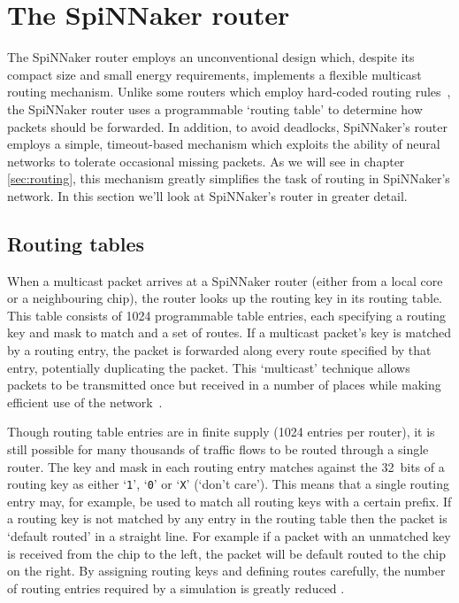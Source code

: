	\section{The SpiNNaker router}
		
		The SpiNNaker router employs an unconventional design which, despite its
		compact size and small energy requirements, implements a flexible multicast
		routing mechanism. Unlike some routers which employ hard-coded routing
		rules~\cite[chapter~8]{dally04}, the SpiNNaker router uses a programmable
		`routing table' to determine how packets should be forwarded. In addition,
		to avoid deadlocks, SpiNNaker's router employs a simple, timeout-based
		mechanism which exploits the ability of neural networks to tolerate
		occasional missing packets. As we will see in chapter \ref{sec:routing},
		this mechanism greatly simplifies the task of routing in SpiNNaker's
		network. In this section we'll look at SpiNNaker's router in greater
		detail.
		
		\subsection{Routing tables}
		
			When a multicast packet arrives at a SpiNNaker router (either from a
			local core or a neighbouring chip), the router looks up the routing key
			in its routing table. This table consists of \num{1024} programmable
			table entries, each specifying a routing key and mask to match and a set
			of routes.  If a multicast packet's key is matched by a routing entry,
			the packet is forwarded along every route specified by that entry,
			potentially duplicating the packet. This `multicast' technique allows
			packets to be transmitted once but received in a number of places while
			making efficient use of the network~\cite{navaridas12}.
			
			Though routing table entries are in finite supply (\num{1024} entries per
			router), it is still possible for many thousands of traffic flows to be
			routed through a single router. The key and mask in each routing entry
			matches against the 32~bits of a routing key as either `\texttt{1}',
			`\texttt{0}' or `\texttt{X}' (`don't care').  This means that a single
			routing entry may, for example, be used to match all routing keys with a
			certain prefix. If a routing key is not matched by any entry in the
			routing table then the packet is `default routed' in a straight line. For
			example if a packet with an unmatched key is received from the chip to
			the left, the packet will be default routed to the chip on the right. By
			assigning routing keys and defining routes carefully, the number of
			routing entries required by a simulation is greatly reduced
			\cite{davies12}.
			
